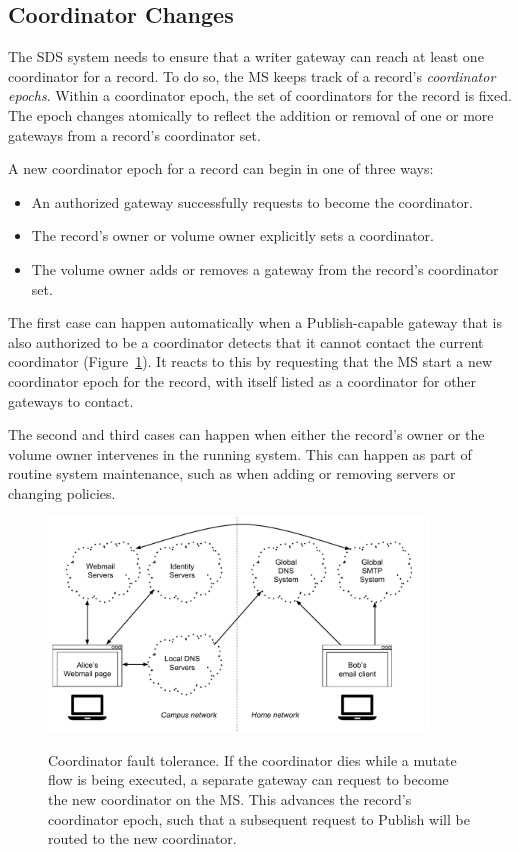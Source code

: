 \subsection{Coordinator Changes}

The SDS system needs to ensure that a writer gateway can reach at least one
coordinator for a record.  To do so, the MS keeps track of a record's
\emph{coordinator epochs}.  Within a coordinator epoch, the set of coordinators for the
record is fixed.  The epoch changes atomically to reflect the addition or removal of one
or more gateways from a record's coordinator set.

A new coordinator epoch for a record can begin in one of three ways:

\begin{itemize}
   \item An authorized gateway successfully requests to become the coordinator.
   \item The record's owner or volume owner explicitly sets a coordinator.
   \item The volume owner adds or removes a gateway from the record's coordinator
      set.
\end{itemize}

The first case can happen automatically when a Publish-capable gateway that is
also authorized to be a coordinator detects that it cannot contact the
current coordinator (Figure~\ref{fig:chap2-coordinator-change}).  It reacts to this by requesting that the MS start
a new coordinator epoch for the record, with itself listed as a coordinator for other gateways to contact.

The second and third cases can happen when either the record's owner or the
volume owner intervenes in the running system.  This can happen as part of routine system
maintenance, such as when adding or removing servers or changing
policies.

\begin{figure}[h!]
   \caption{Coordinator fault tolerance.  If the coordinator dies while a mutate
   flow is being executed, a separate gateway can request to become the new
   coordinator on the MS.  This advances the record's coordinator epoch, such
   that a subsequent request to Publish will be routed to the new coordinator.}
   \centering
   \includegraphics[width=0.9\textwidth,page=11]{figures/dissertation-figures}
   \label{fig:chap2-coordinator-change}
\end{figure}

